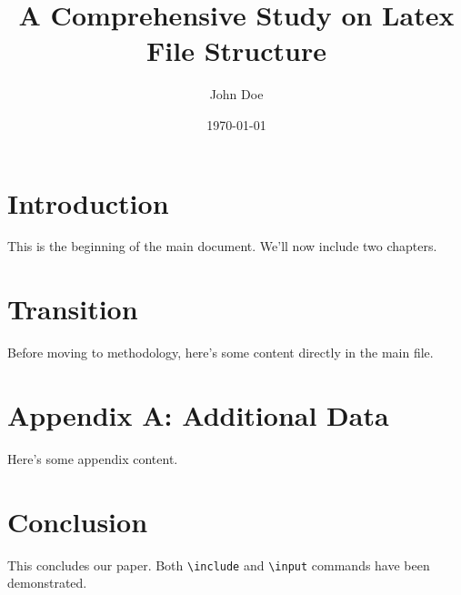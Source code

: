 \documentclass[12pt,a4paper]{article}
\title{A Comprehensive Study on Latex File Structure}
\author{John Doe}
\date{\today}
\begin{document}
\maketitle





\tableofcontents
\listoffigures
\listoftables

\section{Introduction}
This is the beginning of the main document. 
We'll now include two chapters.



\section{Transition}
Before moving to methodology, here's some content directly in the main file.



\appendix
\section{Appendix A: Additional Data}
Here's some appendix content.


\section{Conclusion}
This concludes our paper. Both \texttt{\textbackslash include} and \texttt{\textbackslash input} 
commands have been demonstrated.
\end{document}
